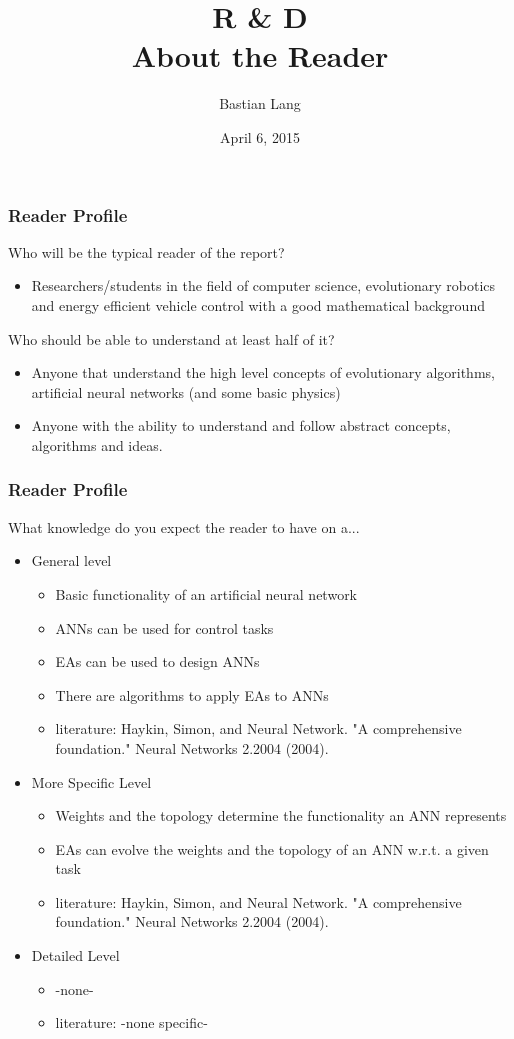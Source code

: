 \documentclass[8pt]{beamer}
\title[R \& D]{R \& D\\About the Reader} %
\author{Bastian Lang} %
\institute[BRSU] %
{
Master of Autonomous Systems \\ %
}
\date{April 6, 2015}
\begin{document}
\listoffigures
\begin{frame}
\titlepage 
\end{frame}


\begin{frame}
	\frametitle{Reader Profile}
	Who will be the typical reader of the report?
	\begin{itemize}
		\item Researchers/students in the field of computer science, evolutionary robotics and energy efficient vehicle control with a good mathematical background
	\end{itemize}
	Who should be able to understand at least half of it?
	\begin{itemize}
		\item Anyone that understand the high level concepts of evolutionary algorithms, artificial neural networks (and some basic physics)
		\item Anyone with the ability to understand and follow abstract concepts, algorithms and ideas.
	\end{itemize}
\end{frame}

\begin{frame}
	\frametitle{Reader Profile}
	What knowledge do you expect the reader to have on a...
	\begin{itemize}
		\item General level
		\begin{itemize}
			\item Basic functionality of an artificial neural network
			\item ANNs can be used for control tasks
			\item EAs can be used to design ANNs
			\item There are algorithms to apply EAs to ANNs
			\item literature: Haykin, Simon, and Neural Network. "A comprehensive foundation." Neural Networks 2.2004 (2004).
		\end{itemize}
		
		\item More Specific Level
		\begin{itemize}
			\item Weights and the topology determine the functionality an ANN represents
			\item EAs can evolve the weights and the topology of an ANN w.r.t. a given task
			\item literature: Haykin, Simon, and Neural Network. "A comprehensive foundation." Neural Networks 2.2004 (2004).
		\end{itemize}
		\item Detailed Level
		\begin{itemize}
			\item -none-
			\item literature: -none specific-
		\end{itemize}
	\end{itemize}
\end{frame}
\end{document}
